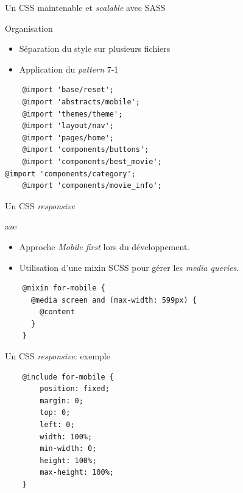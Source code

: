 \begin{frame}[fragile]{Un CSS maintenable et \textit{scalable} avec SASS}  
  \begin{block}{Organisation}
    \begin{itemize}
    \item Séparation du style sur plusieurs fichiers
    \item Application du \textit{pattern} 7-1
    \end{itemize}
  \end{block}

  \begin{verbatim}
    @import 'base/reset';
    @import 'abstracts/mobile';
    @import 'themes/theme';
    @import 'layout/nav';
    @import 'pages/home';
    @import 'components/buttons';
    @import 'components/best_movie';                                                                                                                 @import 'components/category';
    @import 'components/movie_info';
  \end{verbatim}

\end{frame}

\begin{frame}[fragile]{Un CSS \textit{responsive}}
  \begin{block}{aze}
    \begin{itemize}
    \item Approche \textit{Mobile first} lors du développement.
    \item Utilisation d'une mixin SCSS pour gérer les \textit{media queries}.
    \end{itemize}
  \end{block}
  
  \begin{verbatim}
    @mixin for-mobile {
      @media screen and (max-width: 599px) {
        @content
      }
    }
  \end{verbatim}
\end{frame}

\begin{frame}[fragile]{Un CSS \textit{responsive}: exemple}
  
  \begin{verbatim}
    @include for-mobile {
        position: fixed;
        margin: 0;
        top: 0;
        left: 0;
        width: 100%;
        min-width: 0;
        height: 100%;
        max-height: 100%;
    }
  \end{verbatim}
\end{frame}

